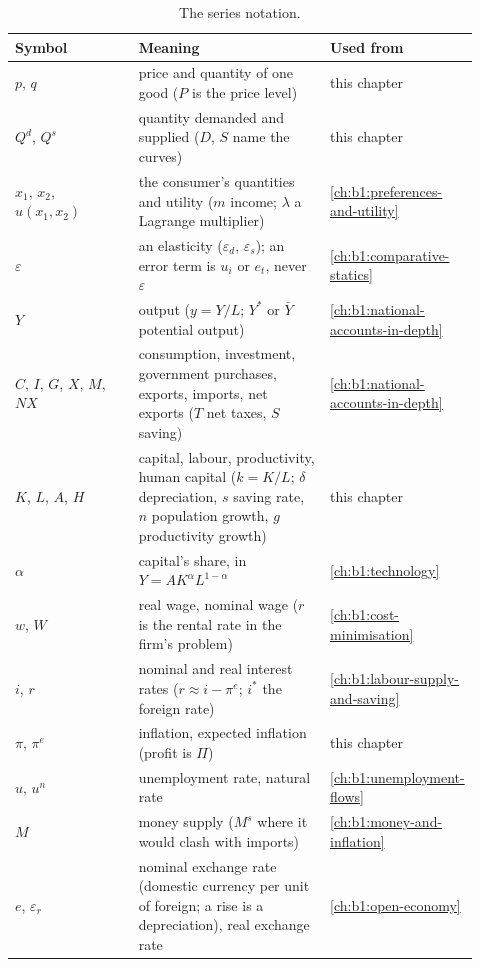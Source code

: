 \begin{table}[ht]
\centering\small
\caption{The series notation.}\label{tab:b1:models-and-data:notation}
\begin{tabular}{@{}>{\raggedright\arraybackslash}p{0.30\linewidth}
                >{\raggedright\arraybackslash}p{0.48\linewidth}
                >{\raggedright\arraybackslash}p{0.14\linewidth}@{}}
\toprule
Symbol & Meaning & Used from \\
\midrule
$p$, $q$ & price and quantity of one good ($P$ is the price level) & this chapter \\
$Q^d$, $Q^s$ & quantity demanded and supplied ($D$, $S$ name the curves) & this chapter \\
$x_1$, $x_2$, $u(x_1, x_2)$ & the consumer's quantities and utility ($m$ income; $\lambda$ a Lagrange multiplier) & \cref{ch:b1:preferences-and-utility} \\
$\varepsilon$ & an elasticity ($\varepsilon_d$, $\varepsilon_s$); an error term is $u_i$ or $e_t$, never $\varepsilon$ & \cref{ch:b1:comparative-statics} \\
$Y$ & output ($y = Y/L$; $Y^*$ or $\bar Y$ potential output) & \cref{ch:b1:national-accounts-in-depth} \\
$C$, $I$, $G$, $X$, $M$, $NX$ & consumption, investment, government purchases, exports, imports, net exports ($T$ net taxes, $S$ saving) & \cref{ch:b1:national-accounts-in-depth} \\
$K$, $L$, $A$, $H$ & capital, labour, productivity, human capital ($k = K/L$; $\delta$ depreciation, $s$ saving rate, $n$ population growth, $g$ productivity growth) & this chapter \\
$\alpha$ & capital's share, in $Y = AK^\alpha L^{1-\alpha}$ & \cref{ch:b1:technology} \\
$w$, $W$ & real wage, nominal wage ($r$ is the rental rate in the firm's problem) & \cref{ch:b1:cost-minimisation} \\
$i$, $r$ & nominal and real interest rates ($r \approx i - \pi^e$; $i^*$ the foreign rate) & \cref{ch:b1:labour-supply-and-saving} \\
$\pi$, $\pi^e$ & inflation, expected inflation (profit is $\Pi$) & this chapter \\
$u$, $u^n$ & unemployment rate, natural rate & \cref{ch:b1:unemployment-flows} \\
$M$ & money supply ($M^s$ where it would clash with imports) & \cref{ch:b1:money-and-inflation} \\
$e$, $\varepsilon_r$ & nominal exchange rate (domestic currency per unit of foreign; a rise is a depreciation), real exchange rate & \cref{ch:b1:open-economy} \\

\end{tabular}
\end{table}

